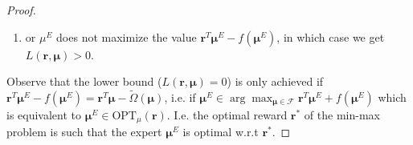 \begin{proof}
\begin{enumerate}
        \item or  $\mu^E$ does not maximize the value $\bm{r}^T \bm{\mu}^E - f(\bm{\mu}^E)$, in  which case we get $ L(\bm{r},\bm{\mu})>0$.
    \end{enumerate}
    Observe that the lower bound ($ L(\bm{r},\bm{\mu})=0$) is only achieved if $\bm{r}^T \bm{\mu}^E - f(\bm{\mu}^E)=\bm{r}^T \bm{\mu} - \tilde{\Omega}(\bm{\mu})$, i.e. if $\bm{\mu}^E \in \arg \max_{\bm{\mu} \in \mathcal{F}} \bm{r}^T \bm{\mu}^E + f(\bm{\mu}^E)$ which is equivalent to $\bm{\mu}^E \in  \text{OPT}_\mu(\bm{r})$. I.e. the optimal reward $\bm{r}^*$ of the min-max problem is such that the expert $\bm{\mu}^E$ is optimal w.r.t $\bm{r}^*$.
    
\end{proof}

